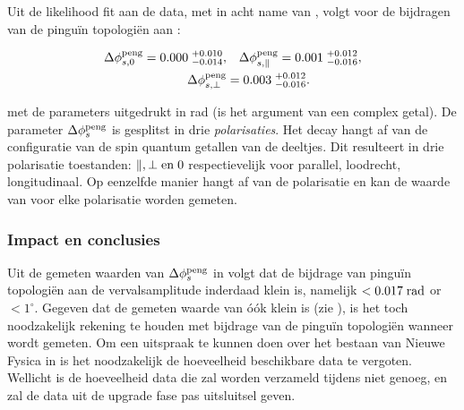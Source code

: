 Uit de likelihood fit aan de data, met in acht name van \cite{Fleischer:1999zi,Faller:2008gt,DeBruyn:2014oga,DeBruyn-thesis},
volgt voor de bijdragen van de pingu\"in topologi\"en aan \phis:


\begin{align}
\label{app_nl_delta_phis_result}
  \Delta\phi^{\rm peng}_{s,{0}}         = 0.000 \; ^{+0.010}_{-0.014}, &\quad  \Delta\phi^{\rm peng}_{s,{\parallel}} = 0.001 \; ^{+0.012}_{-0.016}, \nonumber \\
  \Delta\phi^{\rm peng}_{s,{\perp}}     &= 0.003 \; ^{+0.012}_{-0.016}.
\end{align}


\noindent met de parameters uitgedrukt in rad (\phis is het argument van een complex getal).
De parameter $\Delta\phi_{s}^{\tiny\text{peng}}$ is gesplitst in drie {\it polarisaties}.
Het decay  \BsJpsiPhi hangt af van de configuratie van de spin quantum getallen van de deeltjes.
Dit resulteert in drie polarisatie toestanden: $\parallel,\perp {\rm en}\; 0$ respectievelijk voor parallel,
loodrecht, longitudinaal. Op eenzelfde manier hangt \phis af van de polarisatie en kan de waarde van \phis voor
elke polarisatie worden gemeten.

\subsubsection{Impact en conclusies}
Uit de gemeten waarden van $\Delta\phi_{s}^{\tiny\text{peng}}$ in  volgt dat de bijdrage
van pingu\"in topologi\"en aan de \BsJpsiPhi vervalsamplitude inderdaad klein is, namelijk  $<0.017 \; {\rm rad}$ or $<1^\circ$.
Gegeven dat de gemeten waarde van \phis \'o\'ok klein is (zie ), is het toch noodzakelijk rekening te
houden met bijdrage van de pingu\"in topologi\"en wanneer \phis wordt gemeten. Om een uitspraak te kunnen doen over het bestaan
van Nieuwe Fysica in \phis is het noodzakelijk de hoeveelheid beschikbare data te vergoten. Wellicht is de hoeveelheid data die
zal worden verzameld tijdens \lhcb \runtwo niet genoeg, en zal de data uit de upgrade fase pas uitsluitsel geven.

